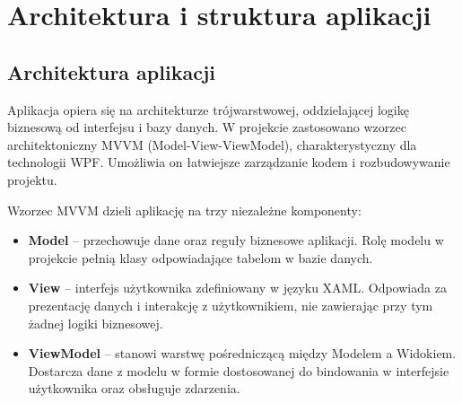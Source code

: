 \chapter{Architektura i struktura aplikacji}
\label{ch:architektura}

\section{Architektura aplikacji}
Aplikacja opiera się na architekturze trójwarstwowej, oddzielającej logikę biznesową od interfejsu i bazy danych. W projekcie zastosowano wzorzec architektoniczny MVVM\cite{MicrosoftMVVM} (Model-View-ViewModel), charakterystyczny dla technologii WPF. Umożliwia on łatwiejsze zarządzanie kodem i rozbudowywanie projektu.

Wzorzec MVVM dzieli aplikację na trzy niezależne komponenty:
\begin{itemize}
    \item \textbf{Model} -- przechowuje dane oraz reguły biznesowe aplikacji. Rolę modelu w projekcie pełnią klasy odpowiadające tabelom w bazie danych.
    \item \textbf{View} -- interfejs użytkownika zdefiniowany w języku XAML. Odpowiada za prezentację danych i interakcję z użytkownikiem, nie zawierając przy tym żadnej logiki biznesowej.
    \item \textbf{ViewModel} -- stanowi warstwę pośredniczącą między Modelem a Widokiem. Dostarcza dane z modelu w formie dostosowanej do bindowania w interfejsie użytkownika oraz obsługuje zdarzenia.
\end{itemize}


